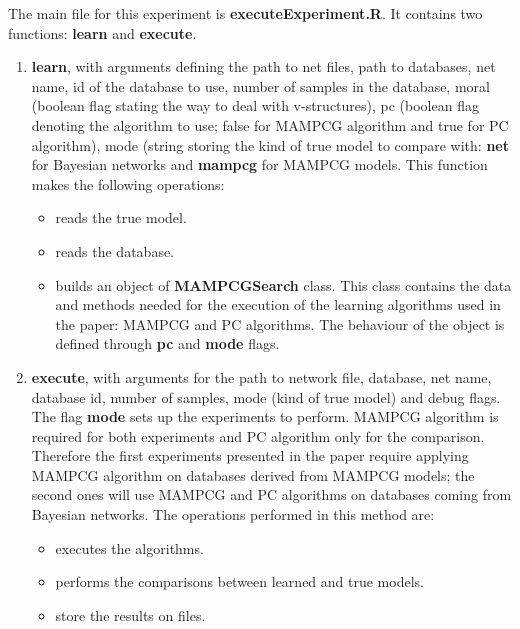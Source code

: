 \documentclass[11pt,professionalfont]{article}
\begin{document}
The main file for this experiment is \textbf{executeExperiment.R}. It
contains two functions: \textbf{learn} and \textbf{execute}.

\begin{enumerate}
  \item \textbf{learn}, with arguments defining the path to net files, path
  to databases, net name, id of the database to use, number of samples in
  the database, moral (boolean flag stating the way to deal with v-structures),
  pc (boolean flag denoting the algorithm to use; false for MAMPCG algorithm
  and true for PC algorithm), mode (string storing the kind of true model to
  compare with: \textbf{net} for Bayesian networks and \textbf{mampcg} for
  MAMPCG models. This function makes the following operations:

  \begin{itemize}
	\item reads the true model.
	\item reads the database.
	\item builds an object of \textbf{MAMPCGSearch} class. This class contains
          the data and methods needed for the execution of the learning algorithms
		  used in the paper: MAMPCG and PC algorithms. The behaviour of the object
		  is defined through \textbf{pc} and \textbf{mode} flags.
  \end{itemize}
 
  \item \textbf{execute}, with arguments for the path to network file, database,
  net name, database id, number of samples, mode (kind of true model) and debug    
  flags. The flag \textbf{mode} sets up the experiments to perform.  MAMPCG algorithm 
  is required for both experiments and PC algorithm only for the comparison. Therefore 
  the first experiments presented in the paper require applying MAMPCG algorithm on 
  databases derived from MAMPCG models; the second ones will use MAMPCG and PC algorithms 
  on databases coming from Bayesian networks. The operations performed in this method 
  are:

  \begin{itemize}
	\item executes the algorithms.
    \item performs the comparisons between learned and true models.
    \item store the results on files.
  \end{itemize}
\end{enumerate}
\end{document}
